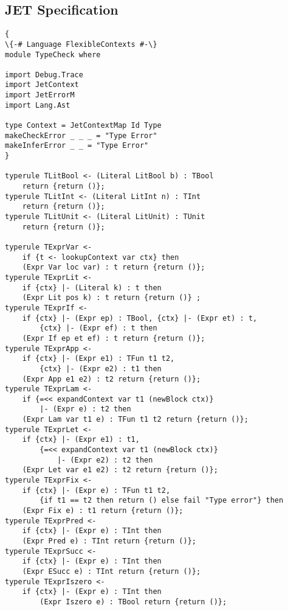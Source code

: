 \subsection{JET Specification}
\begin{lstlisting}
{
\{-# Language FlexibleContexts #-\}
module TypeCheck where

import Debug.Trace
import JetContext
import JetErrorM
import Lang.Ast

type Context = JetContextMap Id Type
makeCheckError _ _ _ = "Type Error"
makeInferError _ _ = "Type Error"
}

typerule TLitBool <- (Literal LitBool b) : TBool 
    return {return ()};
typerule TLitInt <- (Literal LitInt n) : TInt 
    return {return ()};
typerule TLitUnit <- (Literal LitUnit) : TUnit 
    return {return ()};

typerule TExprVar <- 
    if {t <- lookupContext var ctx} then 
    (Expr Var loc var) : t return {return ()};
typerule TExprLit <- 
    if {ctx} |- (Literal k) : t then 
    (Expr Lit pos k) : t return {return ()} ;
typerule TExprIf <- 
    if {ctx} |- (Expr ep) : TBool, {ctx} |- (Expr et) : t, 
        {ctx} |- (Expr ef) : t then 
    (Expr If ep et ef) : t return {return ()};
typerule TExprApp <- 
    if {ctx} |- (Expr e1) : TFun t1 t2, 
        {ctx} |- (Expr e2) : t1 then 
    (Expr App e1 e2) : t2 return {return ()};
typerule TExprLam <- 
    if {=<< expandContext var t1 (newBlock ctx)} 
        |- (Expr e) : t2 then 
    (Expr Lam var t1 e) : TFun t1 t2 return {return ()};
typerule TExprLet <- 
    if {ctx} |- (Expr e1) : t1, 
        {=<< expandContext var t1 (newBlock ctx)} 
            |- (Expr e2) : t2 then 
    (Expr Let var e1 e2) : t2 return {return ()};
typerule TExprFix <- 
    if {ctx} |- (Expr e) : TFun t1 t2, 
        {if t1 == t2 then return () else fail "Type error"} then 
    (Expr Fix e) : t1 return {return ()};
typerule TExprPred <- 
    if {ctx} |- (Expr e) : TInt then 
    (Expr Pred e) : TInt return {return ()};
typerule TExprSucc <- 
    if {ctx} |- (Expr e) : TInt then 
    (Expr ESucc e) : TInt return {return ()};
typerule TExprIszero <- 
    if {ctx} |- (Expr e) : TInt then 
        (Expr Iszero e) : TBool return {return ()};
\end{lstlisting}